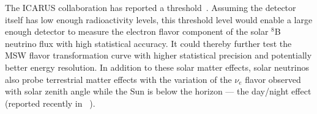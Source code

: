 

The ICARUS collaboration has reported a 
threshold~\cite{Guglielmi:2012}. Assuming the %
detector itself
has low enough radioactivity levels, this threshold level would enable
a large enough detector to measure the electron flavor component of
the solar $^8$B neutrino flux with high statistical accuracy. It could %
thereby further test the MSW flavor transformation curve with higher statistical precision and
potentially better energy resolution. 
In addition to these solar
matter effects, solar 
neutrinos also probe terrestrial matter effects
with the variation of the $\nu_e$ flavor observed with solar zenith
angle while the Sun is below the horizon --- the day/night effect (reported recently in ~\cite{Renshaw:2013dzu}). 


